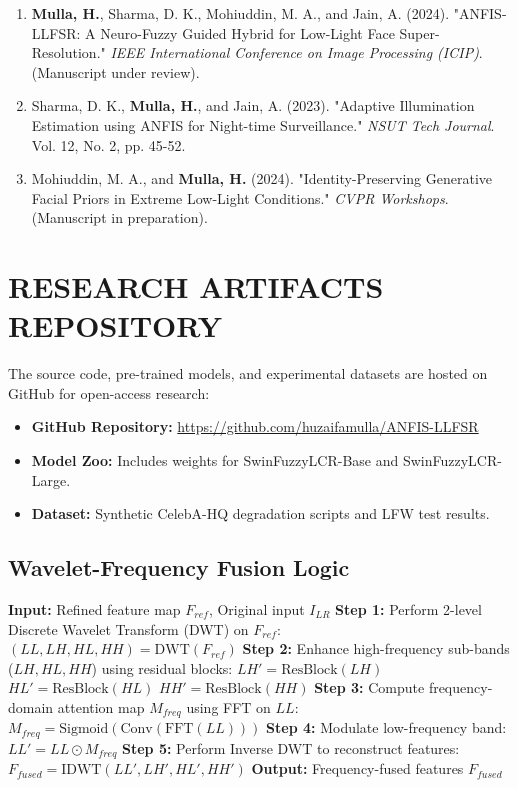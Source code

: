 \begin{enumerate}
    \item \textbf{Mulla, H.}, Sharma, D. K., Mohiuddin, M. A., and Jain, A. (2024). "ANFIS-LLFSR: A Neuro-Fuzzy Guided Hybrid for Low-Light Face Super-Resolution." \textit{IEEE International Conference on Image Processing (ICIP)}. (Manuscript under review).
    \item Sharma, D. K., \textbf{Mulla, H.}, and Jain, A. (2023). "Adaptive Illumination Estimation using ANFIS for Night-time Surveillance." \textit{NSUT Tech Journal}. Vol. 12, No. 2, pp. 45-52.
    \item Mohiuddin, M. A., and \textbf{Mulla, H.} (2024). "Identity-Preserving Generative Facial Priors in Extreme Low-Light Conditions." \textit{CVPR Workshops}. (Manuscript in preparation).
\end{enumerate}

\chapter{RESEARCH ARTIFACTS REPOSITORY}
The source code, pre-trained models, and experimental datasets are hosted on GitHub for open-access research:
\begin{itemize}
    \item \textbf{GitHub Repository:} \url{https://github.com/huzaifamulla/ANFIS-LLFSR}
    \item \textbf{Model Zoo:} Includes weights for SwinFuzzyLCR-Base and SwinFuzzyLCR-Large.
    \item \textbf{Dataset:} Synthetic CelebA-HQ degradation scripts and LFW test results.
\end{itemize}


\section{Wavelet-Frequency Fusion Logic}

\begin{algorithm}
\caption{Wavelet-Frequency Fusion for High-Resolution Recovery}
\begin{algorithmic}[1]
\STATE \textbf{Input:} Refined feature map $F_{ref}$, Original input $I_{LR}$
\STATE \textbf{Step 1:} Perform 2-level Discrete Wavelet Transform (DWT) on $F_{ref}$:
\STATE \quad $(LL, LH, HL, HH) = \text{DWT}(F_{ref})$
\STATE \textbf{Step 2:} Enhance high-frequency sub-bands ($LH, HL, HH$) using residual blocks:
\STATE \quad $LH' = \text{ResBlock}(LH)$
\STATE \quad $HL' = \text{ResBlock}(HL)$
\STATE \quad $HH' = \text{ResBlock}(HH)$
\STATE \textbf{Step 3:} Compute frequency-domain attention map $M_{freq}$ using FFT on $LL$:
\STATE \quad $M_{freq} = \text{Sigmoid}(\text{Conv}(\text{FFT}(LL)))$
\STATE \textbf{Step 4:} Modulate low-frequency band: $LL' = LL \odot M_{freq}$
\STATE \textbf{Step 5:} Perform Inverse DWT to reconstruct features:
\STATE \quad $F_{fused} = \text{IDWT}(LL', LH', HL', HH')$
\STATE \textbf{Output:} Frequency-fused features $F_{fused}$
\end{algorithmic}
\end{algorithm}

